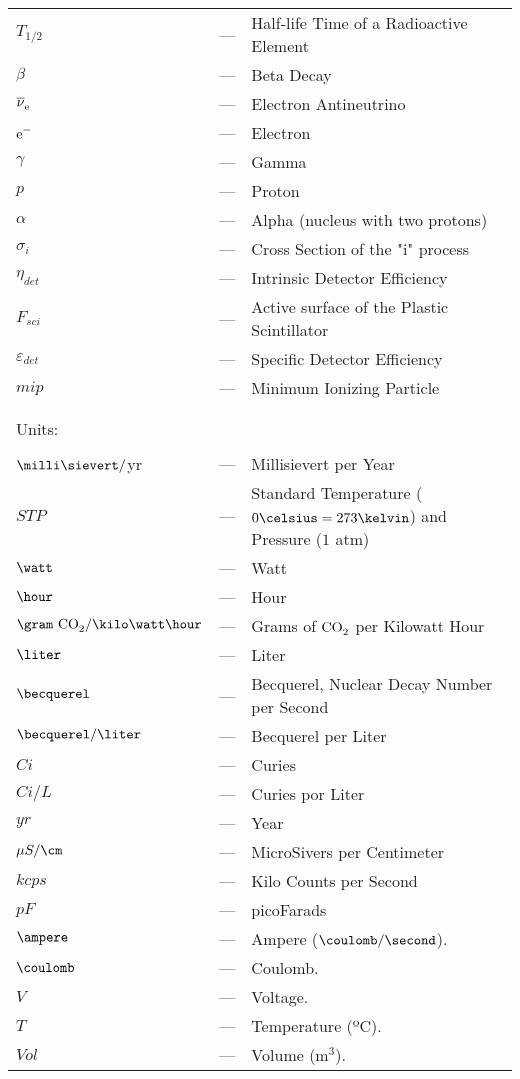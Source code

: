 \begin{longtable}{p{25mm} c p{120mm} }
$T_{1/2}$ & --- & Half-life Time of a Radioactive Element\\
$\beta$ & --- & Beta Decay\\
$\ce{\overline{\nu}_e}$ & --- & Electron Antineutrino\\
$\ce{e^-}$ & --- & Electron\\
$\gamma$ & --- & Gamma\\
$p$ & --- & Proton\\
$\alpha$ & --- & Alpha (nucleus with two protons)\\
$\sigma_i$ & --- & Cross Section of the "i" process\\
$\eta_{det}$ & --- & Intrinsic Detector Efficiency\\
$F_{sci}$ & --- & Active surface of the Plastic Scintillator\\
$\varepsilon_{det}$ & --- & Specific Detector Efficiency\\
$mip$ & --- & Minimum Ionizing Particle\\

\\
\\

\multicolumn{3}{l}{Units:}\\
\\
$\milli\sievert/$yr & --- & Millisievert per Year\\

$STP$ & --- & Standard Temperature ($0\celsius=273\kelvin$) and Pressure ($1$ atm)\\
$\watt$ & --- & Watt\\
$\hour$ & --- & Hour\\
$\gram~\ce{CO_2} /\kilo\watt\hour$ & --- & Grams of $\ce{CO_2}$ per Kilowatt Hour\\
$\liter$ & --- & Liter\\
$\becquerel$ & --- & Becquerel, Nuclear Decay Number per Second\\
$\becquerel/\liter$ & --- & Becquerel per Liter\\
$Ci$ & --- & Curies\\
$Ci/L$ & --- & Curies por Liter\\
$yr$ & --- & Year\\
$\mu S/\cm$ & --- & MicroSivers per Centimeter\\
$kcps$ & --- & Kilo Counts per Second\\
$pF$ & --- & picoFarads\\
$\ampere$ & --- & Ampere ($\coulomb/\second$).\\
$\coulomb$ & --- & Coulomb.\\
$V$ & --- & Voltage.\\
$T$ & --- & Temperature (ºC).\\
$Vol$ & --- & Volume (m$^3$).\\



\end{longtable}
